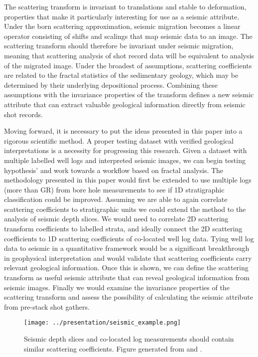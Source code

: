 \documentclass[journal]{IEEEtran}
\begin{document}
The scattering transform is invariant to translations and stable to deformation, properties that make it particularly interesting for use
as a seismic attribute. Under the born scattering approximation, seismic migration becomes a linear operator consisting of shifts 
and scalings that map seismic data to an image. The scattering transform should therefore be invariant under seismic migration,
meaning that scattering analysis of shot record data will be equivalent to analysis of the migrated image. Under the broadest of assumptions,
scattering coefficients are related to the fractal statistics of the sedimentary geology, which may be determined by their underlying depositional process.
Combining these assumptions with the invariance properties of the transform defines a new seismic attribute that can extract valuable geological information
directly from seismic shot records. 

Moving forward, it is necessary to put the ideas presented in this paper into a rigorous scientific method. A proper testing dataset with verified geological
interpretations is a necessity for progressing this research. Given a dataset with multiple labelled well logs and interpreted seismic images, we can begin
testing hypothesis' and work towards a workflow based on fractal analysis. The methodology presented in this paper would first be extended
to use multiple logs (more than GR) from bore hole measurements to see if 1D stratigraphic classification could be improved. Assuming we are able to again correlate
scattering coefficients to stratigraphic units we could extend the method to the analysis of seismic depth slices. We would need to correlate
2D scattering transform coefficients to labelled strata, and ideally connect the 2D scattering coefficients to 1D scattering coefficients of co-located well log data.
Tying well log data to seismic in a quantitative framework would be a significant breakthrough in geophysical interpretation and would validate 
that scattering coefficients carry relevant geological information. Once this is shown, we can define the scattering transform as useful seismic attribute that
can reveal geological information from seismic images. Finally we would examine the invariance properties of the scattering transform and assess the possibility
of calculating the seismic attribute from pre-stack shot gathers.

 \begin{figure}[!t]
\centering
\texttt{[image: ../presentation/seismic\_example.png]}
\caption{Seismic depth slices and co-located log measurements should contain similar scattering coefficients. Figure generated from \cite{usgs} and \cite{Chopra}.}
\label{fig:seismic_example}
\end{figure}
\end{document}

